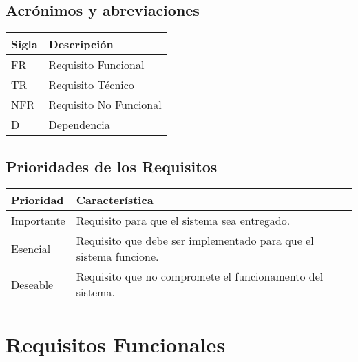 \documentclass{article}
\begin{document}
  \subsection{Acrónimos y abreviaciones}
    \FloatBarrier
    \begin{table}[H]
      \begin{center}
        \begin{tabular}[pos]{|m{2cm} | m{12cm}|} 
          \hline
          \cellcolor[gray]{0.9}\textbf{Sigla} & \cellcolor[gray]{0.9}\textbf{Descripción} \\ \hline
          FR      & Requisito Funcional  \\ \hline
					TR      & Requisito Técnico  \\ \hline
          NFR     & Requisito No Funcional  \\ \hline
          D       & Dependencia  \\ \hline
        \end{tabular}
      \end{center}
    \end{table}  

  \subsection{Prioridades de los Requisitos}
    \FloatBarrier
    \begin{table}[H]
      \begin{center}
        \begin{tabular}[pos]{|m{2cm} | m{12cm}|} 
          \hline
          \cellcolor[gray]{0.9}\textbf{Prioridad} & \cellcolor[gray]{0.9}\textbf{Característica} \\ \hline
          Importante     & Requisito para que el sistema sea entregado.  \\ \hline
          Esencial       & Requisito que debe ser implementado para que el sistema funcione.  \\ \hline
          Deseable       & Requisito que no compromete el funcionamento del sistema.  \\ \hline
        \end{tabular}
      \end{center}
    \end{table}  

  \section{Requisitos Funcionales}
	
\end{document}
